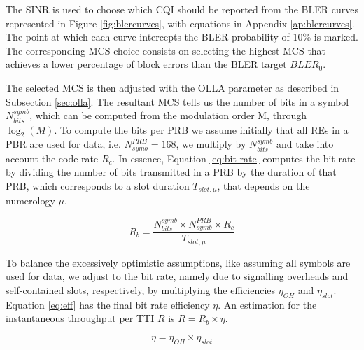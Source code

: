 The SINR is used to choose which CQI should be reported from the BLER curves represented in Figure \ref{fig:blercurves}, with equations in Appendix \ref{ap:blercurves}. The point at which each curve intercepts the BLER probability of 10\% is marked. The corresponding MCS choice consists on selecting the highest MCS that achieves a lower percentage of block errors than the \ac{BLER} target $BLER_0$.



The selected MCS is then adjusted with the OLLA parameter as described in Subsection \ref{sec:olla}. The resultant MCS tells us the number of bits in a symbol $N_{bits}^{symb}$, which can be computed from the modulation order M, through $\log_2(M)$. To compute the bits per PRB we assume initially that all REs in a PBR are used for data, i.e. $N_{symb}^{PRB} = 168$, we multiply by $N_{bits}^{symb}$ and take into account the code rate $R_c$. In essence, Equation \eqref{eq:bit rate} computes the bit rate by dividing the number of bits transmitted in a PRB by the duration of that PRB, which corresponds to a slot duration $T_{slot, \mu}$, that depends on the numerology $\mu$.

\begin{equation} \label{eq:bit rate}
    R_b = \frac{N_{bits}^{symb} \times N_{symb}^{PRB} \times R_{c}}{T_{slot, \mu}} 
\end{equation}

To balance the excessively optimistic assumptions, like assuming all symbols are used for data, we adjust to the bit rate, namely due to signalling overheads and self-contained slots, respectively, by multiplying the efficiencies $\eta_{OH}$ and $\eta_{slot}$. Equation \eqref{eq:eff} has the final bit rate efficiency $\eta$. An estimation for the instantaneous throughput per TTI $R$ is $R = R_b \times \eta$.


\begin{equation} \label{eq:eff}
    \eta = \eta_{OH} \times \eta_{slot}
\end{equation}




